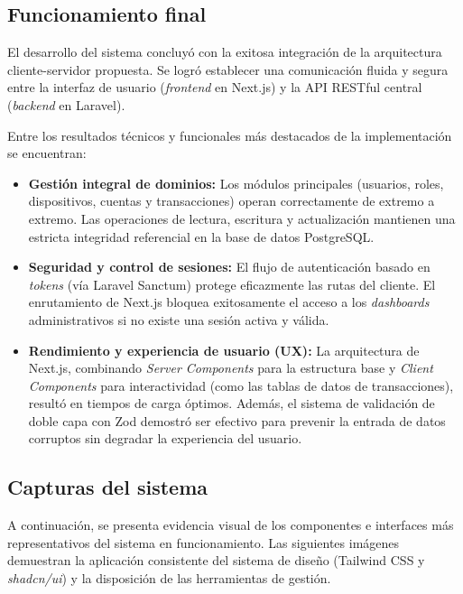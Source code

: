 \documentclass[12pt,letterpaper]{report}
\begin{document}
	\subsection{Funcionamiento final}
	El desarrollo del sistema concluyó con la exitosa integración de la arquitectura cliente-servidor propuesta. Se logró establecer una comunicación fluida y segura entre la interfaz de usuario (\textit{front\-end} en Next.js) y la API RESTful central (\textit{back\-end} en Laravel). 
	
	Entre los resultados técnicos y funcionales más destacados de la implementación se encuentran:
	\begin{itemize}
		\item \textbf{Gestión integral de dominios:} Los módulos principales (usuarios, roles, dispositivos, cuentas y transacciones) operan correctamente de extremo a extremo. Las operaciones de lectura, escritura y actualización mantienen una estricta integridad referencial en la base de datos PostgreSQL.
		\item \textbf{Seguridad y control de sesiones:} El flujo de autenticación basado en \textit{tokens} (vía Laravel Sanctum) protege eficazmente las rutas del cliente. El enrutamiento de Next.js bloquea exitosamente el acceso a los \textit{dash\-boards} administrativos si no existe una sesión activa y válida.
		\item \textbf{Rendimiento y experiencia de usuario (UX):} La arquitectura de Next.js, combinando \textit{Server Components} para la estructura base y \textit{Client Components} para interactividad (como las tablas de datos de transacciones), resultó en tiempos de carga óptimos. Además, el sistema de validación de doble capa con Zod demostró ser efectivo para prevenir la entrada de datos corruptos sin degradar la experiencia del usuario.
	\end{itemize}
	
	\subsection{Capturas del sistema}
	A continuación, se presenta evidencia visual de los componentes e interfaces más representativos del sistema en funcionamiento. Las siguientes imágenes demuestran la aplicación consistente del sistema de diseño (Tailwind CSS y \textit{shadcn/ui}) y la disposición de las herramientas de gestión.
	
	
\end{document}
